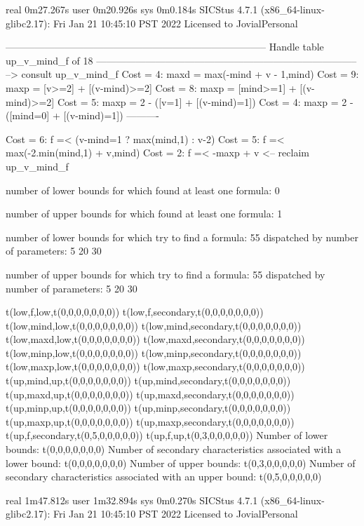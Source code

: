 real	0m27.267s
user	0m20.926s
sys	0m0.184s
SICStus 4.7.1 (x86_64-linux-glibc2.17): Fri Jan 21 10:45:10 PST 2022
Licensed to JovialPersonal


--------------------------------------------------------------------------------
Handle table up_v_mind_f of 18
--------------------------------------------------------------------------------
--> consult up_v_mind_f
Cost =  4:  maxd = max(-mind + v - 1,mind)
Cost =  9:  maxp = [v>=2] + [(v-mind)>=2]
Cost =  8:  maxp = [mind>=1] + [(v-mind)>=2]
Cost =  5:  maxp = 2 - ([v=1] + [(v-mind)=1])
Cost =  4:  maxp = 2 - ([mind=0] + [(v-mind)=1])
----------

Cost =  6:  f =< (v-mind=1 ? max(mind,1) : v-2)
Cost =  5:  f =< max(-2.min(mind,1) + v,mind)
Cost =  2:  f =< -maxp + v
<-- reclaim up_v_mind_f

number of lower bounds for which found at least one formula: 0

number of upper bounds for which found at least one formula: 1

number of lower bounds for which try to find a formula: 55
dispatched by number of parameters: 5  20  30

number of upper bounds for which try to find a formula: 55
dispatched by number of parameters: 5  20  30

t(low,f,low,t(0,0,0,0,0,0,0))
t(low,f,secondary,t(0,0,0,0,0,0,0))
t(low,mind,low,t(0,0,0,0,0,0,0))
t(low,mind,secondary,t(0,0,0,0,0,0,0))
t(low,maxd,low,t(0,0,0,0,0,0,0))
t(low,maxd,secondary,t(0,0,0,0,0,0,0))
t(low,minp,low,t(0,0,0,0,0,0,0))
t(low,minp,secondary,t(0,0,0,0,0,0,0))
t(low,maxp,low,t(0,0,0,0,0,0,0))
t(low,maxp,secondary,t(0,0,0,0,0,0,0))
t(up,mind,up,t(0,0,0,0,0,0,0))
t(up,mind,secondary,t(0,0,0,0,0,0,0))
t(up,maxd,up,t(0,0,0,0,0,0,0))
t(up,maxd,secondary,t(0,0,0,0,0,0,0))
t(up,minp,up,t(0,0,0,0,0,0,0))
t(up,minp,secondary,t(0,0,0,0,0,0,0))
t(up,maxp,up,t(0,0,0,0,0,0,0))
t(up,maxp,secondary,t(0,0,0,0,0,0,0))
t(up,f,secondary,t(0,5,0,0,0,0,0))
t(up,f,up,t(0,3,0,0,0,0,0))
Number of lower bounds:                                             t(0,0,0,0,0,0,0)
Number of secondary characteristics associated with a lower bound:  t(0,0,0,0,0,0,0)
Number of upper bounds:                                             t(0,3,0,0,0,0,0)
Number of secondary characteristics associated with an upper bound: t(0,5,0,0,0,0,0)

real	1m47.812s
user	1m32.894s
sys	0m0.270s
SICStus 4.7.1 (x86_64-linux-glibc2.17): Fri Jan 21 10:45:10 PST 2022
Licensed to JovialPersonal


